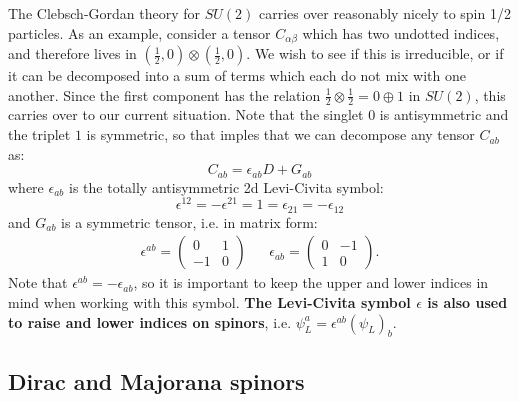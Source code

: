 \documentclass[11pt, oneside]{article}   	%
\theoremstyle{definition}
\begin{document}
The Clebsch-Gordan theory for $SU(2)$ carries over reasonably nicely to spin 1/2 particles. As an example, consider a tensor 
$C_{\alpha\beta}$ which has two undotted indices, and therefore lives in $(\frac{1}{2}, 0)\otimes (\frac{1}{2}, 0)$. We wish to see if this is 
irreducible, or if it can be decomposed into a sum of terms which each do not mix with one another. Since the first component has the 
relation $\frac{1}{2}\otimes\frac{1}{2} = 0\oplus 1$ in $SU(2)$, this carries over to our current situation. Note that the singlet $0$ is 
antisymmetric and the triplet $1$ is symmetric, so that imples that we can decompose any tensor $C_{ab}$ as:
\begin{equation}
	C_{ab} = \epsilon_{ab} D + G_{ab}
\end{equation}
where $\epsilon_{ab}$ is the totally antisymmetric 2d Levi-Civita symbol:
\begin{equation}
	\epsilon^{12} = -\epsilon^{21} = 1 = \epsilon_{21} = -\epsilon_{12}
\end{equation}
and $G_{ab}$ is a symmetric tensor, i.e. in matrix form:
\begin{align}
	\epsilon^{ab} = \begin{pmatrix} 0 & 1 \\ -1 & 0 \end{pmatrix} && \epsilon_{ab} = \begin{pmatrix} 0 & -1 \\ 1 & 0 \end{pmatrix}.
\end{align}
Note that $\epsilon^{ab} = -\epsilon_{ab}$, so it is important to keep the upper and lower indices in mind when working with this symbol. 
\textbf{The Levi-Civita symbol $\epsilon$ is also used to raise and lower indices on spinors}, i.e. $\psi_L^a = \epsilon^{ab}
(\psi_L)_b$. 

\subsection{Dirac and Majorana spinors}
\end{document}
